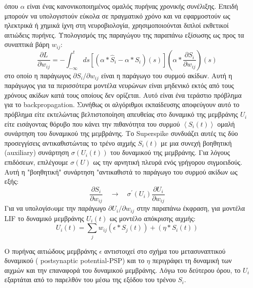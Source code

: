 \documentclass[12pt]{report}
\begin{document}
όπου $\alpha$ είναι ένας κανονικοποιημένος ομαλός πυρήνας χρονικής συνέλιξης. Επειδή μπορούν να υπολογιστούν εύκολα σε πραγματικό χρόνο και να εφαρμοστούν ως ηλεκτρικά ή χημικά ίχνη στη νευροβιολογία, χρησιμοποιούνται διπλοί εκθετικοί αιτιώδεις πυρήνες. Υπολογισμός της παραγώγου της παραπάνω εξίσωσης ως προς τα συναπτικά βάρη $w_{i j}$:
\begin{equation}
\frac{\partial L}{\partial w_{i j}}=-\int_{-\infty}^{t} d s\left[\left(\alpha * \hat{S}_{i}-\alpha * S_{i}\right)(s)\right]\left(\alpha * \frac{\partial S_{i}}{\partial w_{i j}}\right)(s)
\end{equation}
στο οποίο η παράγωγος $\partial S_{i} / \partial w_{i j}$ είναι η παράγωγο του συρμού ακίδων. Αυτή η παράγωγος για τα περισσότερα μοντέλα νευρώνων είναι μηδενικό εκτός από τους χρόνους ακίδων κατά τους οποίους δεν ορίζεται. Αυτό είναι ένα τεράστιο πρόβλημα για το \textlatin{backpropagation}. Συνήθως οι αλγόριθμοι εκπαίδευσης αποφεύγουν αυτό το πρόβλημα είτε εκτελώντας βελτιστοποίηση απευθείας στο δυναμικό της μεμβράνης $U_{i}$ είτε εισάγοντας θόρυβο που κάνει την πιθανότητα του συρμού $\left\langle S_{i}(t)\right\rangle$ ομαλή συνάρτηση του δυναμικού της μεμβράνης. Το \textlatin{Superspike} συνδυάζει αυτές τις δύο προσεγγίσεις αντικαθιστώντας το τρένο αιχμής $S_{i}(t)$ με μια συνεχή βοηθητική (\textlatin{auxiliary}) συνάρτηση $\sigma\left(U_{i}(t)\right)$  του δυναμικού της μεμβράνης. Για λόγους επιδόσεων, επιλέγουμε $\sigma(U)$ ως την αρνητική πλευρά ενός γρήγορου σιγμοειδούς. Αυτή η "βοηθητική" συνάρτηση "αντικαθιστά το παράγωγο του συρμού ακίδων ως εξής:
\begin{equation}
\frac{\partial S_{i}}{\partial w_{i j}} \quad \rightarrow \quad \sigma^{\prime}\left(U_{i}\right) \frac{\partial U_{i}}{\partial w_{i j}}
\end{equation}
Για να υπολογίσoυμε την παράγωγο $\partial U_{i} / \partial w_{i j}$ στην παραπάνω έκφραση, για μοντέλα \textlatin{LIF} το δυναμικό μεμβράνης  $U_{i}(t)$ ως μοντέλο απόκρισης αιχμής:
\begin{equation}
U_{i}(t)=\sum_{j} w_{i j}\left(\epsilon * S_{j}(t)\right)+\left(\eta * S_{i}(t)\right)
\end{equation}

Ο πυρήνας αιτιώδους μεμβράνης $\epsilon$ αντιστοιχεί στο σχήμα του μετασυναπτικού δυναμικού ( \textlatin{postsynaptic potential}-\textlatin{PSP}) και το $\eta$ περιγράφει τη δυναμική των αιχμών και την επαναφορά του δυναμικού μεμβράνης. Λόγω του δεύτερου όρου, το $U_{i}$ εξαρτάται από το παρελθόν του μέσω της εξόδου του τρένου $S_{i}$.
\end{document}
